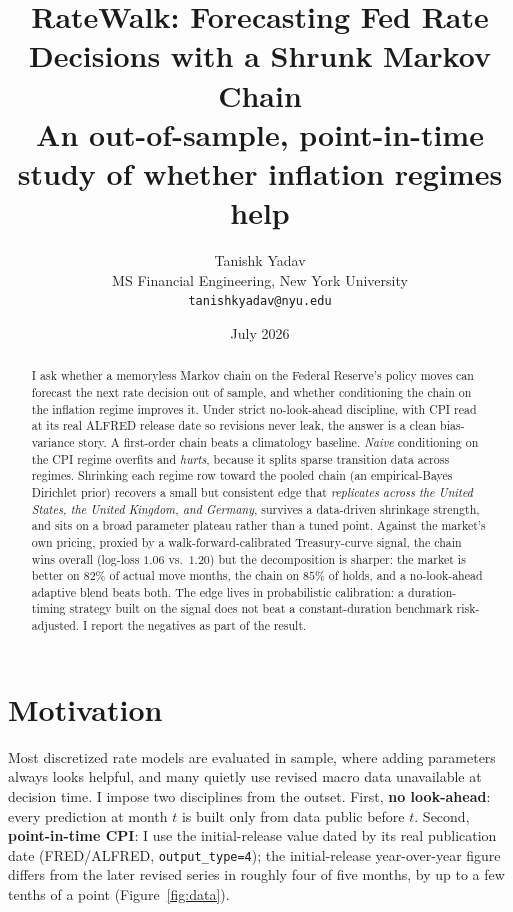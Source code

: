 \documentclass[11pt]{article}
\title{\textbf{RateWalk: Forecasting Fed Rate Decisions with a Shrunk Markov Chain}\\[2pt]
\large An out-of-sample, point-in-time study of whether inflation regimes help}
\author{Tanishk Yadav\\\small MS Financial Engineering, New York University\\\small \texttt{tanishkyadav@nyu.edu}}
\date{July 2026}
\begin{document}
\maketitle
\thispagestyle{fancy}

\begin{abstract}
\noindent
I ask whether a memoryless Markov chain on the Federal Reserve's policy moves can
forecast the next rate decision out of sample, and whether conditioning the chain
on the inflation regime improves it. Under strict no-look-ahead discipline, with
CPI read at its real ALFRED release date so revisions never leak, the answer is a
clean bias-variance story. A first-order chain beats a climatology baseline.
\emph{Naive} conditioning on the CPI regime overfits and \emph{hurts}, because it
splits sparse transition data across regimes. Shrinking each regime row toward the
pooled chain (an empirical-Bayes Dirichlet prior) recovers a small but consistent
edge that \emph{replicates across the United States, the United Kingdom, and
Germany}, survives a data-driven shrinkage strength, and sits on a broad parameter
plateau rather than a tuned point. Against the market's own pricing, proxied by a
walk-forward-calibrated Treasury-curve signal, the chain wins overall (log-loss
$1.06$ vs.\ $1.20$) but the decomposition is sharper: the market is better on
$82\%$ of actual move months, the chain on $85\%$ of holds, and a no-look-ahead
adaptive blend beats both. The edge lives in probabilistic calibration: a
duration-timing strategy built on the signal does not beat a constant-duration
benchmark risk-adjusted. I report the negatives as part of the result.
\end{abstract}

\section{Motivation}
Most discretized rate models are evaluated in sample, where adding parameters
always looks helpful, and many quietly use revised macro data unavailable at
decision time. I impose two disciplines from the outset. First, \textbf{no
look-ahead}: every prediction at month $t$ is built only from data public before
$t$. Second, \textbf{point-in-time CPI}: I use the initial-release value dated by
its real publication date (FRED/ALFRED, \texttt{output\_type=4}); the
initial-release year-over-year figure differs from the later revised series in
roughly four of five months, by up to a few tenths of a point (Figure~\ref{fig:data}).
\end{document}
